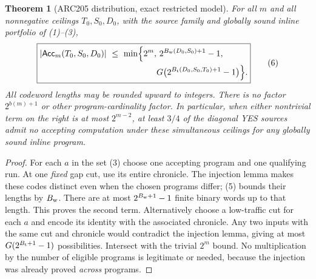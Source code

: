 \documentclass[11pt]{article}
\newtheorem{theorem}{Theorem}
\newcommand{\Acc}{\mathsf{Acc}}
\begin{document}
\begin{theorem}[ARC205 distribution, exact restricted model]
For all $m$ and all nonnegative ceilings $T_0,S_0,D_0$, with the
source family and globally sound inline portfolio of (1)--(3),
\[
 \boxed{\begin{split}
 |\Acc_m(T_0,S_0,D_0)|\ \le\ \min\Bigl\{2^m,&\
 2^{B_{\rm w}(D_0,S_0)+1}-1,\\
 &G\bigl(2^{B_{\rm t}(D_0,S_0,T_0)+1}-1\bigr)\Bigr\}.
 \end{split}}
 \tag{6}
\]
All codeword lengths may be rounded upward to integers.  There is
\emph{no} factor $2^{b(m)+1}$ or other program-cardinality factor.
In particular, when either nontrivial term on the right is at most
$2^{m-2}$, at least $3/4$ of the diagonal YES sources admit \emph{no}
accepting computation under these simultaneous ceilings for
\emph{any} globally sound inline program.
\end{theorem}
\begin{proof}
For each $a$ in the set (3) choose one accepting program and one
qualifying run. At one \emph{fixed} gap cut, use its entire chronicle.
The injection lemma makes these codes distinct even when the
chosen programs differ; (5) bounds their lengths by $B_{\rm w}$.
There are at most $2^{B_{\rm w}+1}-1$ finite binary words up to
that length.  This proves the second term.  Alternatively choose
a low-traffic cut for each $a$ and encode its identity with the
associated chronicle.  Any two inputs with the same cut and
chronicle would contradict the injection lemma, giving at most
$G(2^{B_{\rm t}+1}-1)$ possibilities.  Intersect with the
trivial $2^m$ bound.  No multiplication by the number of eligible
programs is legitimate or needed, because the injection was already
proved \emph{across} programs.
\end{proof}
\end{document}
